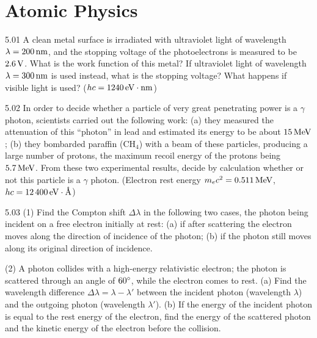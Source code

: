 \section{Atomic Physics}

\begin{problem}{5.01}
A clean metal surface is irradiated with ultraviolet light of wavelength $\lambda = 200\,\mathrm{nm}$, and the stopping voltage of the photoelectrons is measured to be $2.6\,\mathrm{V}$. What is the work function of this metal? If ultraviolet light of wavelength $\lambda = 300\,\mathrm{nm}$ is used instead, what is the stopping voltage? What happens if visible light is used? ($hc = 1240\,\mathrm{eV\cdot nm}$)
\end{problem}

\begin{problem}{5.02}
In order to decide whether a particle of very great penetrating power is a $\gamma$ photon, scientists carried out the following work: (a) they measured the attenuation of this ``photon'' in lead and estimated its energy to be about $15\,\mathrm{MeV}$; (b) they bombarded paraffin ($\mathrm{CH_4}$) with a beam of these particles, producing a large number of protons, the maximum recoil energy of the protons being $5.7\,\mathrm{MeV}$. From these two experimental results, decide by calculation whether or not this particle is a $\gamma$ photon. (Electron rest energy $m_ec^2 = 0.511\,\mathrm{MeV}$, $hc = 12\,400\,\mathrm{eV}\cdot\text{\AA}$)
\end{problem}

\begin{problem}{5.03}
(1) Find the Compton shift $\Delta\lambda$ in the following two cases, the photon being incident on a free electron initially at rest:
(a) if after scattering the electron moves along the direction of incidence of the photon;
(b) if the photon still moves along its original direction of incidence.

(2) A photon collides with a high-energy relativistic electron; the photon is scattered through an angle of $60^{\circ}$, while the electron comes to rest.
(a) Find the wavelength difference $\Delta\lambda = \lambda - \lambda'$ between the incident photon (wavelength $\lambda$) and the outgoing photon (wavelength $\lambda'$).
(b) If the energy of the incident photon is equal to the rest energy of the electron, find the energy of the scattered photon and the kinetic energy of the electron before the collision.
\end{problem}

